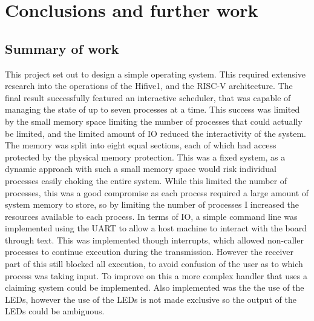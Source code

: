 \chapter[Conclusions and further work]{Conclusions and further work}
\label{cha:conc}
\section{Summary of work}
This project set out to design a simple operating system. This required extensive research into the operations of the Hifive1, and the RISC-V architecture. The final result successfully featured an interactive scheduler, that was capable of managing the state of up to seven processes at a time. This success was limited by the small memory space limiting the number of processes that could actually be limited, and the limited amount of IO reduced the interactivity of the system. The memory was split into eight equal sections, each of which had access protected by the physical memory protection. This was a fixed system, as a dynamic approach with such a small memory space would risk individual processes easily choking the entire system. While this limited the number of processes, this was a good compromise as each process required a large amount of system memory to store, so by limiting the number of processes I increased the resources available to each process. In terms of IO, a simple command line was implemented using the UART to allow a host machine to interact with the board through text. This was implemented though interrupts, which allowed non-caller processes to continue execution during the transmission. However the receiver part of this still blocked all execution, to avoid confusion of the user as to which process was taking input. To improve on this a more complex handler that uses a claiming system could be implemented. Also implemented was the the use of the LEDs, however the use of the LEDs is not made exclusive so the output of the LEDs could be ambiguous.

